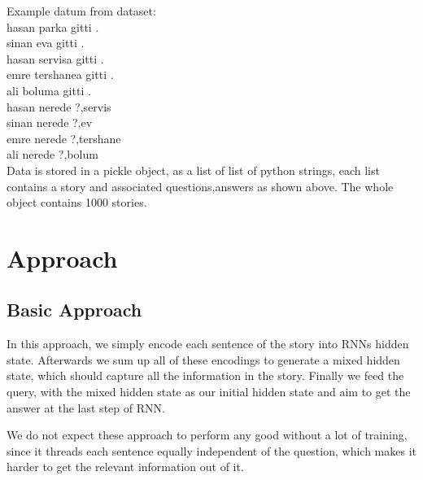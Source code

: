 \documentclass[conference,compsoc]{IEEEtran}
\begin{document}
Example datum from dataset:\\
hasan parka gitti .\\
sinan eva gitti .\\
hasan servisa gitti .\\
emre tershanea gitti .\\
ali boluma gitti .\\
hasan nerede ?,servis\\
sinan nerede ?,ev\\
emre nerede ?,tershane\\
ali nerede ?,bolum\\

Data is stored in a pickle object, as a list of list of python strings,
each list contains a story and associated questions,answers as shown above.
The whole object contains 1000 stories.

\section{Approach}
\subsection{Basic Approach}
In this approach, we simply encode each sentence of the story into RNNs hidden state.
Afterwards we sum up all of these encodings to generate a mixed hidden state, which
should capture all the information in the story. Finally we feed the query, with the
mixed hidden state as our initial hidden state and aim to get the answer at the last
step of RNN. 

We do not expect these approach to perform any good without a lot of training, since
it threads each sentence equally independent of the question, which makes it harder
to get the relevant information out of it.

\end{document}

